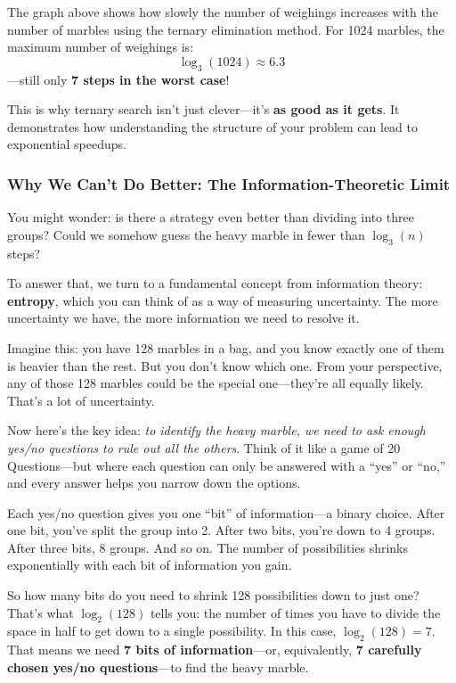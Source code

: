\noindent The graph above shows how slowly the number of weighings increases with the number of marbles using the ternary elimination method. For 1024 marbles, the maximum number of weighings is:
\[
\log_3(1024) \approx 6.3
\]
—still only \textbf{7 steps in the worst case}!

\medskip

This is why ternary search isn’t just clever—it’s \textbf{as good as it gets}. It demonstrates how understanding the structure of your problem can lead to exponential speedups.

\subsubsection{Why We Can't Do Better: The Information-Theoretic Limit}

You might wonder: is there a strategy even better than dividing into three groups? Could we somehow guess the heavy marble in fewer than \( \log_3(n) \) steps?

To answer that, we turn to a fundamental concept from information theory: \textbf{entropy}, which you can think of as a way of measuring uncertainty. The more uncertainty we have, the more information we need to resolve it.

Imagine this: you have 128 marbles in a bag, and you know exactly one of them is heavier than the rest. But you don’t know which one. From your perspective, any of those 128 marbles could be the special one—they’re all equally likely. That’s a lot of uncertainty.

Now here’s the key idea: \textit{to identify the heavy marble, we need to ask enough yes/no questions to rule out all the others}. Think of it like a game of 20 Questions—but where each question can only be answered with a “yes” or “no,” and every answer helps you narrow down the options.

Each yes/no question gives you one “bit” of information—a binary choice. After one bit, you’ve split the group into 2. After two bits, you’re down to 4 groups. After three bits, 8 groups. And so on. The number of possibilities shrinks exponentially with each bit of information you gain.

So how many bits do you need to shrink 128 possibilities down to just one? That’s what \( \log_2(128) \) tells you: the number of times you have to divide the space in half to get down to a single possibility. In this case, \( \log_2(128) = 7 \). That means we need \textbf{7 bits of information}—or, equivalently, \textbf{7 carefully chosen yes/no questions}—to find the heavy marble.


